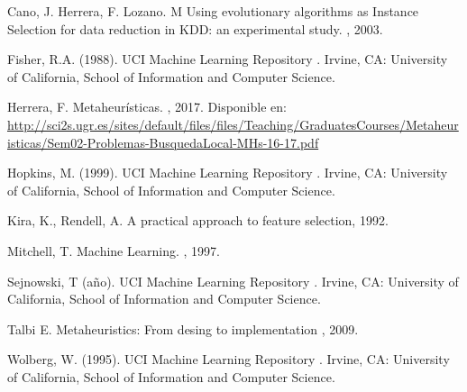 \documentclass{ci5652}
\begin{document}
\begin{thebibliography}{99}

Cano, J. Herrera, F. Lozano. M
\newblock Using evolutionary algorithms as Instance Selection for data
reduction in KDD: an experimental study.
, 2003.

Fisher, R.A. (1988). UCI Machine Learning Repository 
.
\newblock Irvine, CA: University of California, School of Information and Computer Science.

Herrera, F.
\newblock Metaheurísticas. 
, 2017. Disponible en: 
\url{http://sci2s.ugr.es/sites/default/files/files/Teaching/GraduatesCourses/Metaheuristicas/Sem02-Problemas-BusquedaLocal-MHs-16-17.pdf}

Hopkins, M. (1999). UCI Machine Learning Repository 
.
\newblock Irvine, CA: University of California, School of Information and Computer Science.

Kira, K., Rendell, A.
\newblock A practical approach to feature selection, 1992.

Mitchell, T.
\newblock Machine Learning.
, 1997.

Sejnowski, T (año). UCI Machine Learning Repository 
.
\newblock Irvine, CA: University of California, School of Information and Computer Science.

Talbi E.
\newblock Metaheuristics: From desing to implementation
, 2009.

Wolberg, W. (1995). UCI Machine Learning Repository 
.
\newblock Irvine, CA: University of California, School of Information and Computer Science.

%
\end{thebibliography}
\end{document}
